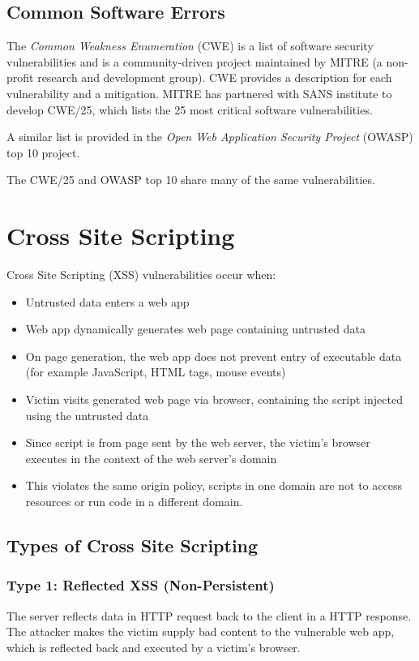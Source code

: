 \subsection*{Common Software Errors}
The \textit{Common Weakness Enumeration} (CWE) is a list of software security vulnerabilities and is a community-driven project maintained by MITRE (a non-profit research and development group). CWE provides a description for each vulnerability and a mitigation. MITRE has partnered with SANS institute to develop CWE/25, which lists the 25 most critical software vulnerabilities.

A similar list is provided in the \textit{Open Web Application Security Project} (OWASP) top 10 project.

The CWE/25 and OWASP top 10 share many of the same vulnerabilities. 

\section*{Cross Site Scripting}
Cross Site Scripting (XSS) vulnerabilities occur when:
\begin{itemize}
    \item Untrusted data enters a web app
    \item Web app dynamically generates web page containing untrusted data
    \item On page generation, the web app does not prevent entry of executable data (for example JavaScript, HTML tags, mouse events)
    \item Victim visits generated web page via browser, containing the script injected using the untrusted data
    \item Since script is from page sent by the web server, the victim's browser executes in the context of the web server's domain
    \item This violates the same origin policy, scripts in one domain are not to access resources or run code in a different domain.
\end{itemize}
\subsection*{Types of Cross Site Scripting}
\subsubsection*{Type 1: Reflected XSS (Non-Persistent)}
The server reflects data in HTTP request back to the client in a HTTP response. The attacker makes the victim supply bad content to the vulnerable web app, which is reflected back and executed by a victim's browser.
